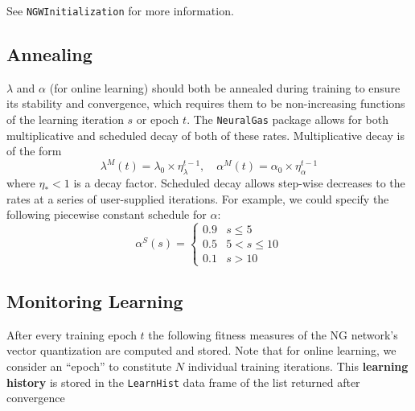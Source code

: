 \documentclass[11pt,]{article}
\begin{document}
See \texttt{NGWInitialization} for more information.

\hypertarget{annealing}{%
\subsection{Annealing}\label{annealing}}

\(\lambda\) and \(\alpha\) (for online learning) should both be annealed
during training to ensure its stability and convergence, which requires
them to be non-increasing functions of the learning iteration \(s\) or
epoch \(t\). The \texttt{NeuralGas} package allows for both
multiplicative and scheduled decay of both of these rates.
Multiplicative decay is of the form
\[ \lambda^M(t) = \lambda_0 \times \eta_{\lambda}^{t-1}, \quad \alpha^M(t) = \alpha_0 \times \eta_{\alpha}^{t-1}\]
where \(\eta_{*} < 1\) is a decay factor. Scheduled decay allows
step-wise decreases to the rates at a series of user-supplied
iterations. For example, we could specify the following piecewise
constant schedule for \(\alpha\):
\[ \alpha^S(s) = \begin{cases} 0.9 & s \leq 5 \\ 0.5 & 5 < s \leq 10 \\ 0.1 & s > 10 \end{cases}\]

\hypertarget{monitoring-learning}{%
\subsection{Monitoring Learning}\label{monitoring-learning}}

After every training epoch \(t\) the following fitness measures of the
NG network's vector quantization are computed and stored. Note that for
online learning, we consider an ``epoch'' to constitute \(N\) individual
training iterations. This \textbf{learning history} is stored in the
\texttt{LearnHist} data frame of the list returned after convergence
\end{document}
